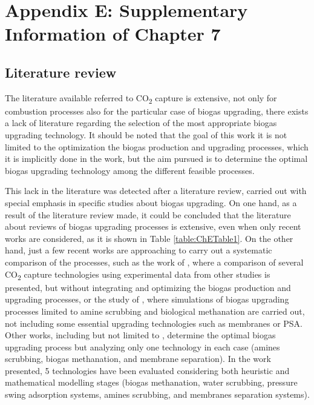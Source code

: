 \chapter{Appendix E: Supplementary Information of Chapter 7}

\begin{refsection}[referencesCh7]

\section{Literature review}
The literature available referred to CO\textsubscript{2} capture is extensive, not only for combustion processes also for the particular case of biogas upgrading, there exists a lack of literature regarding the selection of the most appropriate biogas upgrading technology. It should be noted that the goal of this work it is not limited to the optimization the biogas production and upgrading processes, which it is implicitly done in the work, but the aim pursued is to determine the optimal biogas upgrading technology among the different feasible processes.

This lack in the literature was detected after a literature review, carried out with special emphasis in specific studies about biogas upgrading. On one hand, as a result of the literature review made, it could be concluded that the literature about reviews of biogas upgrading processes is extensive, even when only recent works are considered, as it is shown in Table \ref{table:ChETable1}. On the other hand, just a few recent works are approaching to carry out a systematic comparison of the processes, such as the work of \citet{collet2017techno}, where a comparison of several CO\textsubscript{2} capture technologies using experimental data from other studies is presented, but without  integrating and optimizing the biogas production and upgrading processes, or the study of \citet{vo2018techno}, where simulations of biogas upgrading processes limited to amine scrubbing and biological methanation are carried out, not including some essential upgrading technologies such as membranes or PSA. Other works, including but not limited to \citet{capra2018biogas, curto2019renewable, gilassi2019optimizing}, determine the optimal biogas upgrading process but analyzing only one technology in each case (amines scrubbing, biogas methanation, and membrane separation). In the work presented, 5 technologies have been evaluated considering both heuristic and mathematical modelling stages (biogas methanation, water scrubbing, pressure swing adsorption systems, amines scrubbing, and membranes separation systems).


\end{refsection}
